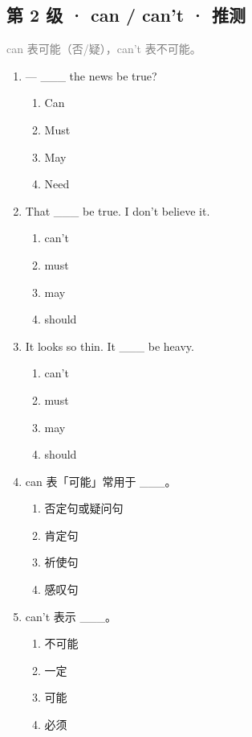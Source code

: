 \documentclass[11pt,a4paper]{ctexart}
\begin{document}
\subsection*{第 2 级 · can / can’t · 推测}
\noindent\textcolor{gray}{can 表可能（否/疑），can’t 表不可能。}\par\smallskip
\begin{enumerate}[leftmargin=*,itemsep=4pt]
\item — \_\_\_ the news be true?
\begin{enumerate}[label=\Alph*.,leftmargin=2em,itemsep=1pt,topsep=2pt]
\item Can
\item Must
\item May
\item Need
\end{enumerate}
\item That \_\_\_ be true. I don’t believe it.
\begin{enumerate}[label=\Alph*.,leftmargin=2em,itemsep=1pt,topsep=2pt]
\item can’t
\item must
\item may
\item should
\end{enumerate}
\item It looks so thin. It \_\_\_ be heavy.
\begin{enumerate}[label=\Alph*.,leftmargin=2em,itemsep=1pt,topsep=2pt]
\item can’t
\item must
\item may
\item should
\end{enumerate}
\item can 表「可能」常用于 \_\_\_。
\begin{enumerate}[label=\Alph*.,leftmargin=2em,itemsep=1pt,topsep=2pt]
\item 否定句或疑问句
\item 肯定句
\item 祈使句
\item 感叹句
\end{enumerate}
\item can’t 表示 \_\_\_。
\begin{enumerate}[label=\Alph*.,leftmargin=2em,itemsep=1pt,topsep=2pt]
\item 不可能
\item 一定
\item 可能
\item 必须

\end{enumerate}
\end{enumerate}
\end{document}
